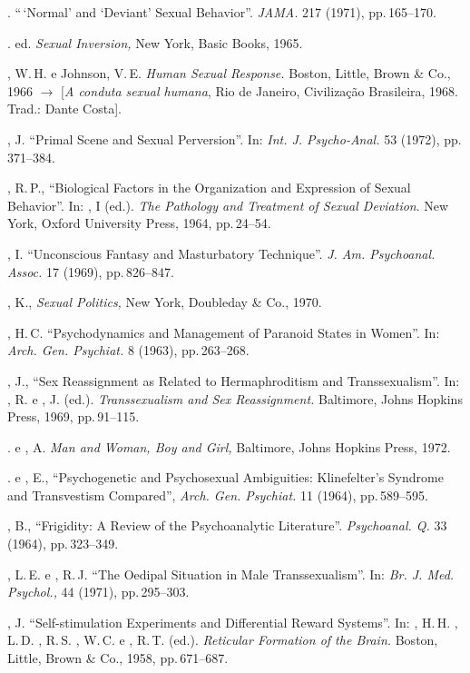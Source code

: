\begin{bibliohedra}
. ``\,`Normal' and `Deviant' Sexual Behavior''.
\textit{JAMA. }217 (1971), pp.\,165--170.

. ed. \textit{Sexual Inversion, }New York, Basic Books, 1965.

, W.\,H. e Johnson, V.\,E. \textit{Human Sexual Response. }Boston,
Little, Brown \& Co., 1966 {$\bm{\rightarrow}$} [\textit{A conduta sexual humana}, Rio de Janeiro,
Civilização Brasileira, 1968. Trad.: Dante Costa].

, J. ``Primal Scene and Sexual
Perversion''. In: \textit{Int. J. Psycho-Anal. }53 (1972), pp.\,371--384.

, R.\,P., ``Biological Factors in the Organization and
Expression of Sexual Behavior''. In: , I (ed.). \textit{The Pathology and
Treatment of Sexual Deviation}. New York, Oxford University Press, 1964, pp.\,24--54.

, I. ``Unconscious Fantasy and Masturbatory
Technique''. \textit{J. Am. Psychoanal. Assoc. } 17 (1969), pp.\,826--847.

, K., \textit{ Sexual Politics, }New York, Doubleday \& Co., 1970.

, H.\,C. ``Psychodynamics and Management of Paranoid States
in Women''. In: \textit{ Arch. Gen. Psychiat. }8 (1963), pp.\,263--268.

, J., ``Sex Reassignment as Related to Hermaphroditism and
Transsexualism''. In: , R. e , J. (ed.). \textit{Transsexualism and 
Sex Reassignment.} Baltimore, Johns Hopkins Press, 1969, pp.\,91--115.

. e , A. \textit{Man and Woman, Boy and Girl,}
Baltimore, Johns Hopkins Press, 1972.

. e , E., ``Psychogenetic and Psychosexual
Ambiguities: Klinefelter's Syndrome and Transvestism
Compared'', \textit{Arch. Gen. Psychiat.} 11 (1964), pp.\,589--595.

, B., ``Frigidity: A Review of the Psychoanalytic
Literature''. \textit{Psychoanal. Q. }33 (1964), pp.\,323--349.

, L.\,E. e , R.\,J. ``The Oedipal Situation in Male
Transsexualism''. In: \textit{Br. J. Med. Psychol., }44 (1971), pp.\,295--303.

, J. ``Self-stimulation Experiments and Differential Reward
Systems''. In: , H.\,H. , L.\,D. , 
R.\,S. , W.\,C. e , R.\,T. (ed.). \textit{Reticular Formation 
of the Brain.} Boston, Little, Brown \& Co., 1958, pp.\,671--687.


\end{bibliohedra}
